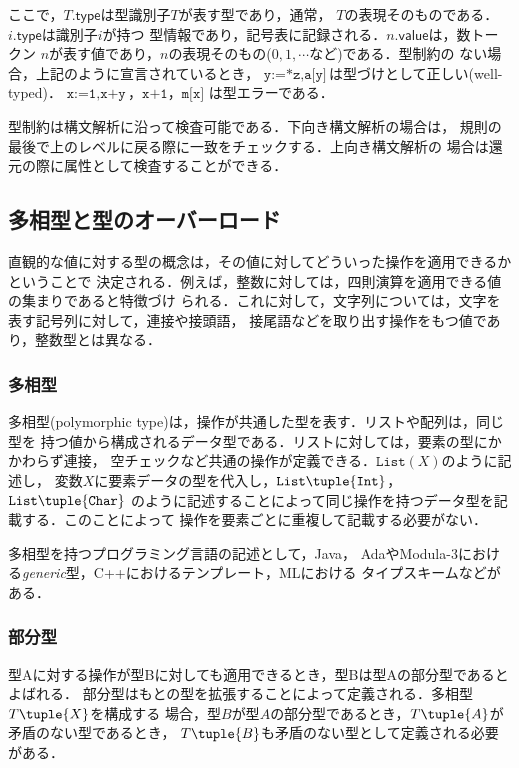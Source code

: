\documentclass[a4j,dvipdfmx]{jbook}
\begin{document}
ここで，$T.\mathsf{type}$は型識別子$T$が表す型であり，通常，
$T$の表現そのものである．$i.\mathsf{type}$は識別子$i$が持つ
型情報であり，記号表に記録される．$n.\mathsf{value}$は，数トークン
$n$が表す値であり，$n$の表現そのもの($0,1,\cdots$など)である．型制約の
ない場合，上記のように宣言されているとき，
$\texttt{y:=*z},\texttt{a[y]}$は型づけとして正しい(well-typed)．
$\texttt{x:=1},\texttt{x+y}$，$\texttt{x+1}$，$\texttt{m[x]}$
は型エラーである．

型制約は構文解析に沿って検査可能である．下向き構文解析の場合は，
規則の最後で上のレベルに戻る際に一致をチェックする．上向き構文解析の
場合は還元の際に属性として検査することができる．

\subsection{多相型と型のオーバーロード}

直観的な値に対する型の概念は，その値に対してどういった操作を適用できるかということで
決定される．例えば，整数に対しては，四則演算を適用できる値の集まりであると特徴づけ
られる．これに対して，文字列については，文字を表す記号列に対して，連接や接頭語，
接尾語などを取り出す操作をもつ値であり，整数型とは異なる．

\subsubsection{多相型}

多相型(polymorphic type)は，操作が共通した型を表す．リストや配列は，同じ型を
持つ値から構成されるデータ型である．リストに対しては，要素の型にかかわらず連接，
空チェックなど共通の操作が定義できる．$\texttt{List}(X)$のように記述し，
変数$X$に要素データの型を代入し，$\texttt{List}\tuple{\texttt{Int}}$，
$\texttt{List}\tuple{\texttt{Char}}$
のように記述することによって同じ操作を持つデータ型を記載する．このことによって
操作を要素ごとに重複して記載する必要がない．

多相型を持つプログラミング言語の記述として，Java，
AdaやModula-3における{\em generic}型，C++におけるテンプレート，MLにおける
タイプスキームなどがある．

\subsubsection{部分型}

型Aに対する操作が型Bに対しても適用できるとき，型Bは型Aの部分型であるとよばれる．
部分型はもとの型を拡張することによって定義される．多相型$T\tuple{X}$を構成する
場合，型$B$が型$A$の部分型であるとき，$T\tuple{A}$が矛盾のない型であるとき，
$T\tuple{B}$も矛盾のない型として定義される必要がある．
\end{document}

